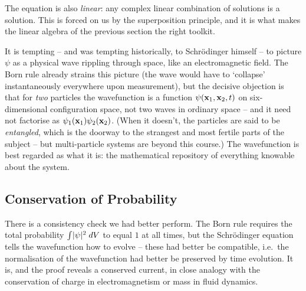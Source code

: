\documentclass[a4paper]{scrartcl}
\begin{document}
\begin{remark}
    The equation is also \emph{linear}: any complex linear combination of solutions is a solution. This is forced on us by the superposition principle, and it is what makes the linear algebra of the previous section the right toolkit.
\end{remark}

\begin{remark}
    It is tempting -- and was tempting historically, to Schr\"odinger himself -- to picture $\psi$ as a physical wave rippling through space, like an electromagnetic field. The Born rule already strains this picture (the wave would have to `collapse' instantaneously everywhere upon measurement), but the decisive objection is that for \emph{two} particles the wavefunction is a function $\psi(\mathbf{x}_1, \mathbf{x}_2, t)$ on six-dimensional configuration space, not two waves in ordinary space -- and it need not factorise as $\psi_1(\mathbf{x}_1)\psi_2(\mathbf{x}_2)$. (When it doesn't, the particles are said to be \emph{entangled}, which is the doorway to the strangest and most fertile parts of the subject -- but multi-particle systems are beyond this course.) The wavefunction is best regarded as what it is: the mathematical repository of everything knowable about the system.
\end{remark}

\subsection{Conservation of Probability}

There is a consistency check we had better perform. The Born rule requires the total probability $\int \lvert\psi\rvert^2 \; d V$ to equal $1$ at all times, but the Schr\"odinger equation tells the wavefunction how to evolve -- these had better be compatible, i.e.\ the normalisation of the wavefunction had better be preserved by time evolution. It is, and the proof reveals a conserved current, in close analogy with the conservation of charge in electromagnetism or mass in fluid dynamics.
\end{document}

